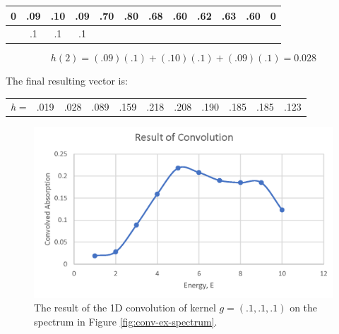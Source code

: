 \begin{table}[h!]
    \centering
    \begin{tabular}{|c|c|c|c|c|c|c|c|c|c|c|c|}
    \hline
    0 & .09 & .10 & .09 & .70 & \multicolumn{1}{c|}{.80} & \multicolumn{1}{c|}{.68} & \multicolumn{1}{c|}{.60} & .62 & .63 & .60 & 0 \\ \hline
      & .1  & .1  & .1  &     &                          &                          &                          &     &     &     &   \\ \hline
    \end{tabular}
\end{table}

$$ 
h(2) = (.09)(.1) + (.10)(.1) + (.09)(.1) = 0.028
$$

\noindent The final resulting vector is:

\begin{table}[h!]
    \centering
    \begin{tabular}{c|c|c|c|c|c|c|c|c|c|c|}
    \cline{2-11}
    \textit{h} = & .019 & .028 & .089 & .159 & .218 & .208 & .190 & .185 & .185 & .123 \\ \cline{2-11} 
    \end{tabular}
\end{table}

\begin{figure}[h!]
    \label{fig:conv-res-spectrum}
    \centering
    \includegraphics[width=.75\linewidth]{Chapters/Figures/conv-example-res.png}
    \caption[1D Convolution Result]{The result of the 1D convolution of kernel $ g = (.1, .1, .1) $  on the spectrum in Figure \ref{fig:conv-ex-spectrum}.}
\end{figure}

